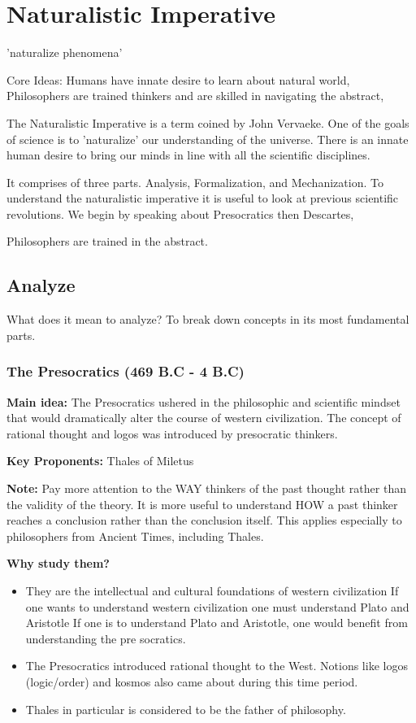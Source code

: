 \documentclass[twoside]{article}
\begin{document}
\section{Naturalistic Imperative}
'naturalize phenomena'

Core Ideas: Humans have innate desire to learn about natural world, Philosophers
are trained thinkers and are skilled in navigating the abstract,

The Naturalistic Imperative is a term coined by John Vervaeke. One of the goals
of science is to 'naturalize' our understanding of the universe. There is an innate
human desire to bring our minds in line with all the scientific disciplines.

It comprises of three parts. Analysis, Formalization, and Mechanization. To understand
the naturalistic imperative it is useful to look at previous scientific revolutions. We
begin by speaking about Presocratics then Descartes,

Philosophers are trained in the abstract.

\subsection{Analyze}
What does it mean to analyze? To break down concepts in its most fundamental
parts.

\subsubsection{The Presocratics (469 B.C - 4 B.C)}
\textbf{Main idea:} The Presocratics ushered in the philosophic and scientific
mindset that would dramatically alter the course of western civilization. The concept
of rational thought and logos was introduced by presocratic thinkers.

\textbf{Key Proponents: } Thales of Miletus

\textbf{Note:} Pay more attention to the WAY thinkers of the past thought
rather than the validity of the theory. It is more useful to understand HOW a past
thinker reaches a conclusion rather than the conclusion itself. This applies especially
to philosophers from Ancient Times, including Thales.




\textbf{Why study them?}
\begin{itemize}
  \item  They are the intellectual and cultural foundations of western civilization
  If one wants to understand western civilization one must understand Plato and Aristotle
  If one is to understand Plato and Aristotle, one would benefit from understanding the pre socratics.
  \item  The Presocratics introduced rational thought to the West. Notions like logos (logic/order)
  and kosmos also came about during this time period.
  \item Thales in particular is considered to be the father of philosophy.
\end{itemize}
\end{document}
